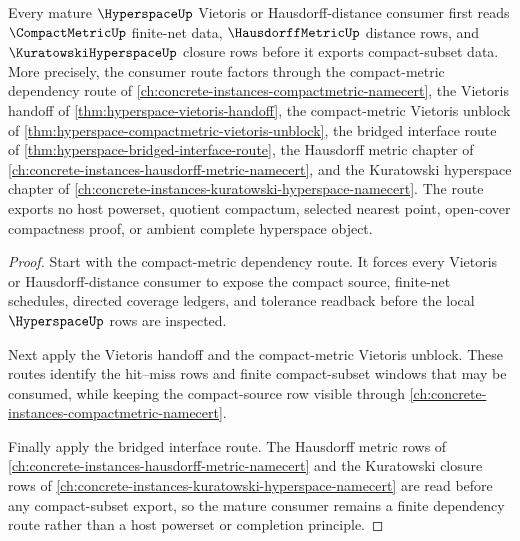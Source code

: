 \begin{theorem}
\label{thm:hyperspace-mature-compact-metric-vietoris-route}
Every mature $\HyperspaceUp$ Vietoris or Hausdorff-distance consumer first reads $\CompactMetricUp$ finite-net data, $\HausdorffMetricUp$ distance rows, and $\KuratowskiHyperspaceUp$ closure rows before it exports compact-subset data. More precisely, the consumer route factors through the compact-metric dependency route of \autoref{ch:concrete-instances-compactmetric-namecert}, the Vietoris handoff of \autoref{thm:hyperspace-vietoris-handoff}, the compact-metric Vietoris unblock of \autoref{thm:hyperspace-compactmetric-vietoris-unblock}, the bridged interface route of \autoref{thm:hyperspace-bridged-interface-route}, the Hausdorff metric chapter of \autoref{ch:concrete-instances-hausdorff-metric-namecert}, and the Kuratowski hyperspace chapter of \autoref{ch:concrete-instances-kuratowski-hyperspace-namecert}. The route exports no host powerset, quotient compactum, selected nearest point, open-cover compactness proof, or ambient complete hyperspace object.
\end{theorem}
\begin{proof}
Start with the compact-metric dependency route. It forces every Vietoris or Hausdorff-distance consumer to expose the compact source, finite-net schedules, directed coverage ledgers, and tolerance readback before the local $\HyperspaceUp$ rows are inspected.

Next apply the Vietoris handoff and the compact-metric Vietoris unblock. These routes identify the hit--miss rows and finite compact-subset windows that may be consumed, while keeping the compact-source row visible through \autoref{ch:concrete-instances-compactmetric-namecert}.

Finally apply the bridged interface route. The Hausdorff metric rows of \autoref{ch:concrete-instances-hausdorff-metric-namecert} and the Kuratowski closure rows of \autoref{ch:concrete-instances-kuratowski-hyperspace-namecert} are read before any compact-subset export, so the mature consumer remains a finite dependency route rather than a host powerset or completion principle.
\end{proof}

